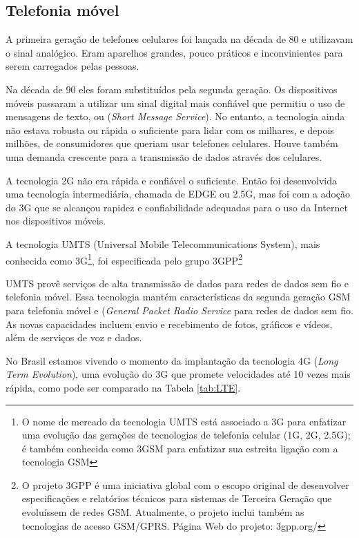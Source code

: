 \subsection{Telefonia móvel}
A primeira geração de telefones celulares foi lançada na década de 80 e utilizavam o sinal analógico. Eram aparelhos grandes, pouco práticos e inconvinientes para serem carregados pelas pessoas.

Na década de 90 eles foram substituídos pela segunda geração. Os dispositivos móveis passaram a utilizar um sinal digital mais confiável que permitiu o uso de mensagens de texto, ou  (\textit{Short Message Service}). No entanto, a tecnologia ainda não estava robusta ou rápida o suficiente para lidar com os milhares, e depois milhões, de consumidores que queriam usar telefones celulares. Houve também uma demanda crescente para a transmissão de dados através dos celulares.

A tecnologia 2G não era rápida e confiável o suficiente. Então foi desenvolvida uma tecnologia intermediária, chamada de EDGE ou 2.5G, mas foi com a adoção do 3G que se alcançou rapidez e confiabilidade adequadas para o uso da Internet nos dispositivos móveis.
\begin{citacao}
A tecnologia UMTS (Universal Mobile Telecommunications System), mais conhecida como 3G\footnote{O nome de mercado da tecnologia UMTS está associado a 3G para enfatizar uma evolução das gerações de tecnologias de telefonia celular (1G, 2G, 2.5G); é também conhecida como 3GSM para enfatizar sua estreita ligação com a tecnologia GSM}, foi especificada pelo grupo 3GPP\footnote{O projeto 3GPP é uma iniciativa global com o escopo original de desenvolver especificações e relatórios técnicos para sistemas de Terceira Geração que evoluíssem de redes GSM. Atualmente, o projeto inclui também as tecnologias de acesso GSM/GPRS. Página Web do projeto: 3gpp.org/}

UMTS provê serviços de alta transmissão de dados para redes de dados sem fio e telefonia móvel. Essa tecnologia mantém características da segunda geração GSM para telefonia móvel e  (\textit{General Packet Radio Service} para redes de dados sem fio. As novas capacidades incluem envio e recebimento de fotos, gráficos e vídeos, além de serviços de voz e dados. \cite{vanni09}
\end{citacao}

No Brasil estamos vivendo o momento da implantação da tecnologia 4G  (\textit{Long Term Evolution}), uma evolução do 3G que promete velocidades até 10 vezes mais rápida, como pode ser comparado na Tabela \ref{tab:LTE}.

